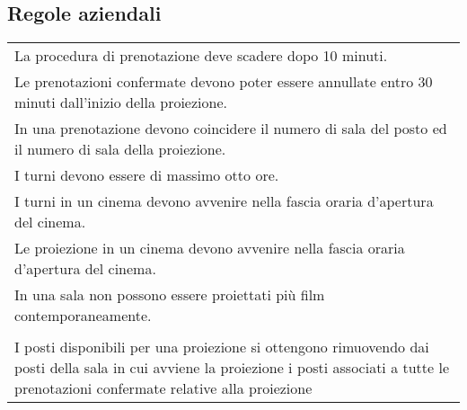 \subsection*{Regole aziendali}
%
%
\begin{longtable}{|p{16.75cm}|}
    \hline
    \rowcolor{tblhdrcolor}
    \multicolumn{1}{|c|}{\textbf{Regole di vincolo}}
    \\\hline
    La procedura di prenotazione deve scadere dopo 10 minuti. \\\hline
    Le prenotazioni confermate devono poter essere annullate entro 30 minuti
    dall'inizio della proiezione.                             \\\hline
    In una prenotazione devono coincidere il numero di sala del posto
    ed il numero di sala della proiezione.                    \\\hline
    I turni devono essere di massimo otto ore.                \\\hline
    I turni in un cinema devono avvenire nella fascia oraria d'apertura
    del cinema.                                               \\\hline
    Le proiezione in un cinema devono avvenire nella fascia oraria d'apertura
    del cinema.                                               \\\hline
    In una sala non possono essere proiettati più film contemporaneamente.
    \\ \hline
    \rowcolor{tblhdrcolor}
    \multicolumn{1}{|c|}{\textbf{Regole di derivazione}}
    \\\hline
    I posti disponibili per una proiezione si ottengono rimuovendo dai posti
    della sala in cui avviene la proiezione i posti associati a tutte le
    prenotazioni confermate relative alla proiezione
    \\ \hline
\end{longtable}

\pagebreak

